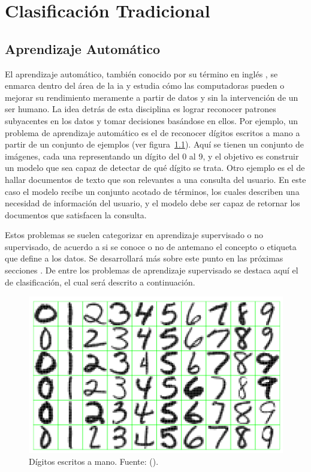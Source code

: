 \chapter{Clasificación Tradicional}

\section{Aprendizaje Automático}

El aprendizaje automático, también conocido por su término en inglés
, se enmarca dentro del área de la
\acrfull{ia} y estudia cómo las computadoras pueden  o
mejorar su rendimiento meramente a partir de datos y sin la intervención de un
ser humano.  La idea detrás de esta disciplina es lograr reconocer patrones
subyacentes en los datos y tomar decisiones basándose en ellos. Por ejemplo, un
problema de aprendizaje automático es el de reconocer dígitos escritos a mano a
partir de un conjunto de ejemplos (ver figura~\ref{fig:reconocimiento_digitos}).
Aquí se tienen un conjunto de imágenes, cada una representando un dígito del 0
al 9, y el objetivo es construir un modelo que sea capaz de detectar de qué
dígito se trata. Otro ejemplo es el de hallar documentos de texto que son
relevantes a una consulta del usuario. En este caso el modelo recibe un conjunto
acotado de términos, los cuales describen una necesidad de información del
usuario, y el modelo debe ser capaz de retornar los documentos que satisfacen la
consulta.

Estos problemas se suelen categorizar en aprendizaje supervisado o no
supervisado, de acuerdo a si se conoce o no de antemano el concepto o etiqueta
que define a los datos. Se desarrollará más sobre este punto en las próximas
secciones . De
entre los problemas de aprendizaje supervisado se destaca aquí el de
clasificación, el cual será descrito a continuación.

\begin{figure}
	\includegraphics[width=0.66\linewidth]{figures/digits_recognition_v2.png}
	\centering
	\caption[Dígitos escritos a mano.]{Dígitos escritos a mano. Fuente: 
		(\citeyear{hastie_elements_2009}).}
	\label{fig:reconocimiento_digitos}
\end{figure}

